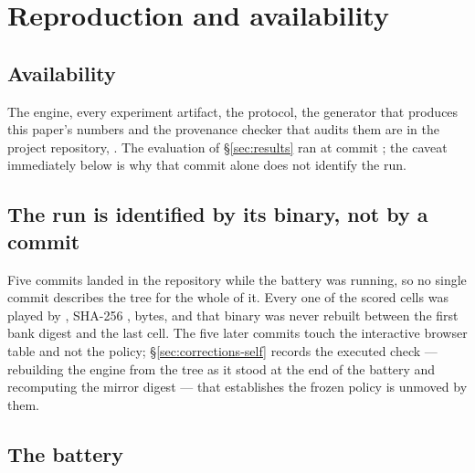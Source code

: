\section{Reproduction and availability}
\label{app:repro}

\subsection*{Availability}

The engine, every experiment artifact, the protocol, the generator that produces this paper's
numbers and the provenance checker that audits them are in the project repository,
. The evaluation of \S\ref{sec:results}
ran at commit \texttt{\vsevenBzeroCommit{}}; the caveat immediately below is why that commit alone
does not identify the run.

\subsection*{The run is identified by its binary, not by a commit}

Five commits landed in the repository while the battery was running, so no single commit describes the
tree for the whole of it. Every one of the \vsevenScoredCells{} scored cells was played by
, SHA-256 \texttt{\vsevenBinarySha{}}, \vsevenBinaryBytes{} bytes, and that
binary was never rebuilt between the first bank digest and the last cell. The five later commits touch
the interactive browser table and not the policy; \S\ref{sec:corrections-self} records the executed
check --- rebuilding the engine from the tree as it stood at the end of the battery and recomputing the
mirror digest --- that establishes the frozen policy is unmoved by them.

\subsection*{The battery}

\begin{table}[h]\centering
\caption{Every preregistered battery against what was measured. \emph{Preregistered} is the count the
protocol names, not the count that ran: deviations D1 and D2 add a B5 reference cell and sixteen B9
cells, because without them ``no single leave-one-out drop exceeds the whole, ``the recovered size
tracks the planted size and ``the planted excess resolves to zero are not computable from the
cells the protocol lists. No cell was dropped.}
\label{tab:battery}

\end{table}

